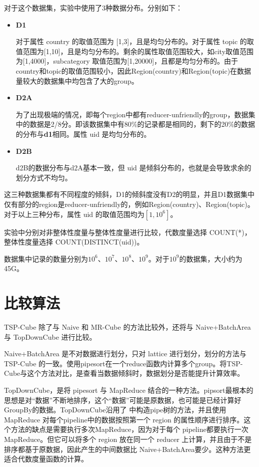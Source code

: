 对于这个数据集，实验中使用了3种数据分布。分别如下：
\begin{itemize}

\item \textbf{D1}

对于属性 country 的取值范围为 [1,3]，且是均匀分布的。对于属性 topic 的取值范围为[1,10]，且是均匀分布的。剩余的属性取值范围较大，如city取值范围为[1,4000]，subcategory 取值范围为[1,20000]，且都是均匀分布的。由于country和topic的取值范围较小，因此Region(country)和Region(topic)在数据量较大的数据集中均包含了大的group。

\item \textbf{D2A}

为了出现极端的情况，即每个region中都有reducer-unfriendly的group，数据集中的数据是2/8分。即该数据集中有80\%的记录都是相同的，剩下的20\%的数据的分布与\textbf{d1}相同。属性 uid 是均匀分布的。

\item \textbf{D2B}

d2B的数据分布与d2A基本一致，但 uid 是倾斜分布的，也就是会导致求余的划分方式不均匀。

\end{itemize}

这三种数据集都有不同程度的倾斜，D1的倾斜度没有D2的明显，并且D1数据集中仅有部分的region是reducer-unfriendly的，例如Region(country)、Region(topic)。对于以上三种分布，属性 uid 的取值范围均为$[1,{10}^{6}]$。

实验中分别对非整体性度量与整体性度量进行比较，代数度量选择 COUNT(*)， 整体性度量选择 COUNT(DISTINCT(uid))。

数据集中记录的数量分别为${10}^{6}$、${10}^{7}$、${10}^{8}$、${10}^{9}$。对于${10}^{9}$的数据集，大小约为45G。


\section{比较算法}

TSP-Cube 除了与 Naive 和 MR-Cube 的方法比较外，还将与 Naive+BatchArea 与 TopDownCube \cite{lee2012efficient} 进行比较。

Naive+BatchArea 是不对数据进行划分，只对 lattice 进行划分，划分的方法与 TSP-Cube 的一致。使用pipesort在一个reduce函数内计算多个group。将TSP-Cube与这个方法对比，是查看当数据倾斜时，数据划分是否能提升计算效率。

TopDownCube，是将 pipesort 与 MapReduce 结合的一种方法。pipsort最根本的思想是对``数据”不断地排序，这个``数据”可能是原数据，也可能是已经计算好GroupBy的数据。TopDownCube沿用了\cite{agarwal1996computation} 中构造pipe树的方法，并且使用 MapReduce 对每个pipeline中的数据按照第一个 region 的属性顺序进行排序。这个方法的缺点是需要执行多次MapReduce，因为对于每个 pipeline都要执行一次 MapReduce。但它可以将多个 region 放在同一个 reducer 上计算，并且由于不是排序都基于原数据，因此产生的中间数据比 Naive+BatchArea要少。这种方法更适合代数度量函数的计算。

